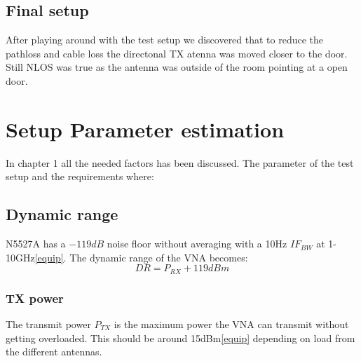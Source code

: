 %
%


\section{Final setup}
After playing around with the test setup we discovered that to reduce the pathloss and cable loss the directonal TX atenna was moved closer to the door. Still NLOS was true as the antenna was outside of the room pointing at a open door.





\chapter{Setup Parameter estimation}
In chapter 1 all the needed factors has been discussed. The parameter of the test setup and the requirements where:

\section{Dynamic range}
N5527A has a $-119dB$ noise floor without averaging with a 10Hz $IF_{BW}$ at 1-10GHz\autoref{equip}. The dynamic range of the VNA becomes:
\begin{equation}
DR = P_{RX}+119dBm 
\label{NFvna}
\end{equation}

\subsection{TX power}
The transmit power $P_{TX}$ is the maximum power the VNA can transmit without getting overloaded. This should be around 15dBm\autoref{equip} depending on load from the different antennas.
